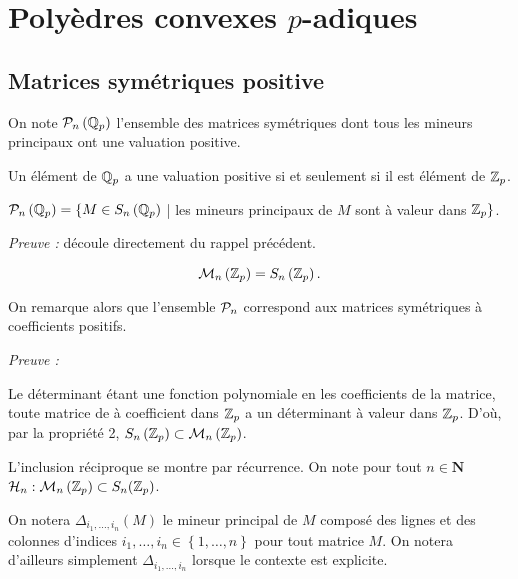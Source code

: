 \section{Polyèdres convexes \texorpdfstring{$p$}{p}-adiques}
\label{sec:polyedre} 
\iffalse
\subsection{Matrices symétriques positive} 

\begin{definition}
	On note $\P_n\left( \Qp \right) $ l'ensemble des matrices symétriques dont tous les mineurs principaux ont une valuation positive.
\end{definition} 

\begin{rappel}
	
Un élément de $ \Qp$ a une valuation positive si et seulement si il est élément de $\Zp$. 
\end{rappel}

\begin{propriete}
	
	$\P_n\left( \Qp \right) = \{ M \in S_n\left( \Qp \right)$ | les\- min\-eurs\- prin\-ci\-paux\- de\- $M$ \-sont \-à \-va\-leur \-dans\- $\Zp \} $.
\end{propriete}

	\textit{Preuve :} découle directement du rappel précédent. 
	\medskip


\begin{prop}
	 \[
		 \Pn = S_n\left( \Zp \right) 
	.\]  
\end{prop}

\begin{remarque}
	On remarque alors que l'ensemble $\P_n$ correspond aux matrices symétriques à coefficients positifs.   
\end{remarque}
	\textit{Preuve :}

 Le déterminant étant une fonction polynomiale en les coefficients de la matrice, toute matrice de à coefficient dans $\Zp$ a un déterminant à valeur dans $\Zp$. D'où, par la propriété 2, $S_n\left( \Zp \right) \subset \Pn $.

 L'inclusion réciproque se montre par récurrence. On note pour tout $n \in \mathbf{N}$ $\mathcal{H}_n :  \Pn \subset  S_n(\Zp )$.

 
 On notera $ \Delta_{i_1,\ldots,i_n}\left( M \right) $ le mineur principal de $M$ composé des lignes et des colonnes d'indices $i_1,\ldots,i_n \in \left\{ 1,\ldots,n \right\} $ pour tout matrice $M$. On notera d'ailleurs simplement  $ \Delta_{i_1,\ldots,i_n}$ lorsque le contexte est explicite.

